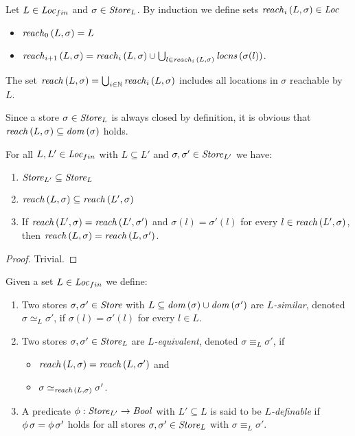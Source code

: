 \documentclass[12pt,a4paper]{report}
\begin{document}
\begin{definition}[Reachability]
  Let $L\in\mathit{Loc}_{fin}$ and $\sigma\in\mathit{Store}_L$. By induction we define sets $\mathit{reach}_{i}\,(L,\sigma) \in \mathit{Loc}$
  \begin{itemize}
    \item $\mathit{reach}_{0}\,(L,\sigma) = L$
    \item $\mathit{reach}_{i+1}\,(L,\sigma) = \mathit{reach}_{i}\,(L,\sigma) \cup \bigcup_{l\in\mathit{reach}_{i}\,(L,\sigma)} \mathit{locns}\,(\sigma(l))$.
  \end{itemize}
  The set $\mathit{reach}\,(L,\sigma) = \bigcup_{i\in\mathbb N} \mathit{reach}_{i}\,(L,\sigma)$ includes all locations in $\sigma$ reachable
  by $L$.
\end{definition}

Since a store $\sigma\in\mathit{Store}_L$ is always closed by definition, it is obvious that
$\mathit{reach}\,(L,\sigma) \subseteq \mathit{dom}\,(\sigma)$ holds.

\begin{lemma}
  For all $L,L'\in\mathit{Loc}_{fin}$ with $L \subseteq L'$ and $\sigma,\sigma'\in\mathit{Store}_{L'}$ we have:
  \begin{enumerate}
    \item $\mathit{Store}_{L'} \subseteq \mathit{Store}_L$
    \item $\mathit{reach}\,(L,\sigma) \subseteq \mathit{reach}\,(L',\sigma)$
    \item If $\mathit{reach}\,(L',\sigma) = \mathit{reach}\,(L',\sigma')$ and $\sigma(l) = \sigma'(l)$ for every $l\in\mathit{reach}\,(L',\sigma)$,
          then $\mathit{reach}\,(L,\sigma) = \mathit{reach}\,(L,\sigma')$.
  \end{enumerate}
\end{lemma}

\begin{proof}
  Trivial.
\end{proof}

\begin{definition}
  Given a set $L\in\mathit{Loc}_{fin}$ we define:
  \begin{enumerate}
    \item Two stores $\sigma,\sigma'\in\mathit{Store}$ with $L \subseteq \mathit{dom}\,(\sigma) \cup \mathit{dom}\,(\sigma')$ are
          {\em $L$-similar}, denoted $\sigma \simeq_L \sigma'$, if $\sigma(l)=\sigma'(l)$ for every
          $l \in L$.

    \item Two stores $\sigma,\sigma'\in\mathit{Store}_L$ are {\em $L$-equivalent}, denoted $\sigma \equiv_L \sigma'$,
          if
          \begin{itemize}
            \item $\mathit{reach}\,(L,\sigma) = \mathit{reach}\,(L,\sigma')$ and
            \item $\sigma \simeq_{\mathit{reach}\,(L,\sigma)} \sigma'$.
          \end{itemize}

    \item A predicate $\phi:\mathit{Store}_{L'} \to \mathit{Bool}$ with $L' \subseteq L$ is said to be {\em $L$-definable} if
          $\phi\,\sigma = \phi\,\sigma'$ holds for all
          stores $\sigma,\sigma'\in\mathit{Store}_L$ with $\sigma \equiv_L \sigma'$.
  \end{enumerate}
\end{definition}
\end{document}
